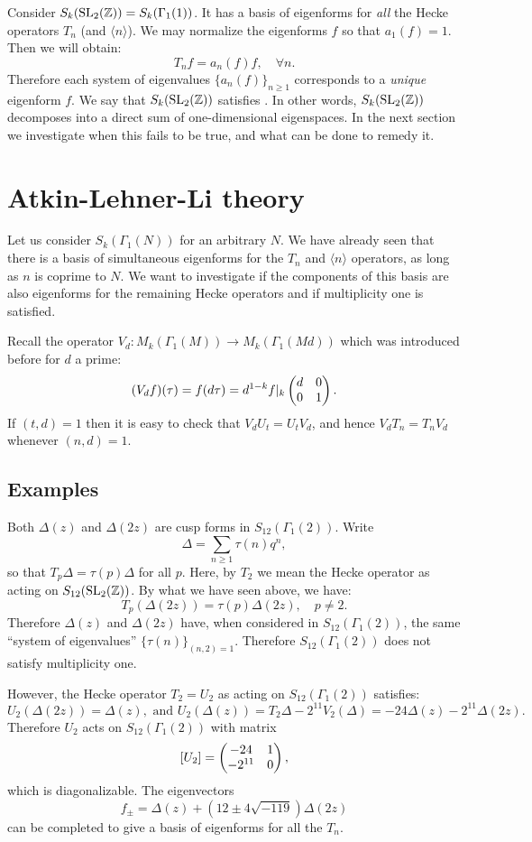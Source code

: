   Consider $S_k(\operatorname{SL}_2(\mathbb{Z})) = S_k(\Gamma_1(1))$. It has a basis of eigenforms for \emph{all} the Hecke operators $T_n$ (and $\langle n\rangle$). We may normalize the eigenforms $f$ so that $a_1(f)=1$. Then we will obtain:
\[
T_n f = a_n(f) f,\quad \forall n.
\]
Therefore each system of eigenvalues $\{a_n(f)\}_{n\geq 1}$ corresponds to a \emph{unique} eigenform $f$. We say that $S_k(\operatorname{SL}_2(\mathbb{Z}))$ satisfies . In other words, $S_k(\operatorname{SL}_2(\mathbb{Z}))$ decomposes into a direct sum of one-dimensional eigenspaces. In the next section we investigate when this fails to be true, and what can be done to remedy it.

\section{Atkin-Lehner-Li theory}
Let us consider $S_k(\Gamma_1(N))$ for an arbitrary $N$. We have already seen that there is a basis of simultaneous eigenforms for the $T_n$ and $\langle n\rangle$ operators, as long as $n$ is coprime to $N$. We want to investigate if the components of this basis are also eigenforms for the remaining Hecke operators and if multiplicity one is satisfied.

Recall the operator $V_d\colon M_k(\Gamma_1(M))\to M_k(\Gamma_1(Md))$ which was introduced before for $d$ a prime:
\[
(V_d f)(\tau) = f(d\tau) = d^{1-k} f|_k\left(\begin{matrix}d&0\\0&1\end{matrix}\right).
\]
If $(t,d)=1$ then it is easy to check that $V_d U_t = U_t V_d$, and hence $V_d T_n = T_n V_d$ whenever $(n,d)=1$.

\subsection{Examples}

  Both $\Delta(z)$ and $\Delta(2z)$ are cusp forms in $S_{12}(\Gamma_1(2))$. Write
\[
\Delta = \sum_{n\geq 1} \tau(n) q^n,
\]
so that $T_p \Delta=\tau(p)\Delta$ for all $p$. Here, by $T_2$ we mean the Hecke operator as acting on $S_{12}(\operatorname{SL}_2(\mathbb{Z}))$. By what we have seen above, we have:
\[
T_p(\Delta(2z)) = \tau(p)\Delta(2z),\quad p\neq 2.
\]
Therefore $\Delta(z)$ and $\Delta(2z)$ have, when considered in $S_{12}(\Gamma_1(2))$, the same ``system of eigenvalues'' $\{\tau(n)\}_{(n,2)=1}$. Therefore $S_{12}(\Gamma_1(2))$ does not satisfy multiplicity one.

However, the Hecke operator $T_2=U_2$ as acting on $S_{12}(\Gamma_1(2))$ satisfies:
\[
U_2(\Delta(2z)) = \Delta(z),\text{ and } U_2(\Delta(z)) = T_2\Delta - 2^{11}V_2(\Delta) = -24\Delta(z) - 2^{11} \Delta(2z).
\]
Therefore $U_2$ acts on $S_{12}(\Gamma_1(2))$ with matrix
\[
[U_2] = \left(\begin{matrix}-24&1\\-2^{11}&0\end{matrix}\right),
\]
which is diagonalizable. The eigenvectors
\[
f_{\pm} = \Delta(z) +  (12 \pm 4\sqrt{-119})\Delta(2z)
\]
can be completed to give a basis of eigenforms for all the $T_n$.


